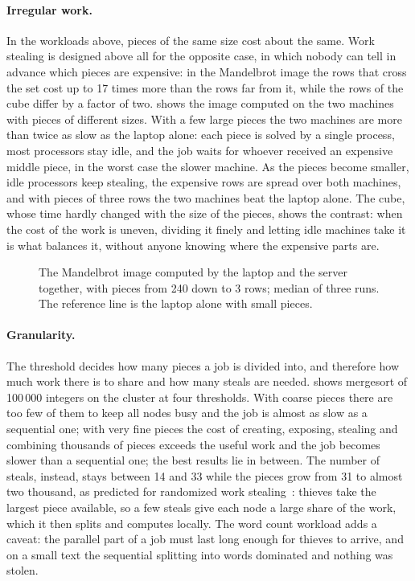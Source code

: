 \documentclass{scrartcl}
\begin{document}
\paragraph{Irregular work.}
In the workloads above, pieces of the same size cost about the same.
%
Work stealing is designed above all for the opposite case, in which nobody can tell in advance which pieces are expensive: in the Mandelbrot image the rows that cross the set cost up to 17 times more than the rows far from it, while the rows of the cube differ by a factor of two.
%
 shows the image computed on the two machines with pieces of different sizes.
%
With a few large pieces the two machines are more than twice as slow as the laptop alone: each piece is solved by a single process, most processors stay idle, and the job waits for whoever received an expensive middle piece, in the worst case the slower machine.
%
As the pieces become smaller, idle processors keep stealing, the expensive rows are spread over both machines, and with pieces of three rows the two machines beat the laptop alone.
%
The cube, whose time hardly changed with the size of the pieces, shows the contrast: when the cost of the work is uneven, dividing it finely and letting idle machines take it is what balances it, without anyone knowing where the expensive parts are.

\begin{figure}
  \centering
  
  \caption{The Mandelbrot image computed by the laptop and the server together, with pieces from 240 down to 3 rows; median of three runs. The reference line is the laptop alone with small pieces.}
  \label{fig:mandelbrot-pieces}
\end{figure}

\paragraph{Granularity.}
The threshold decides how many pieces a job is divided into, and therefore how much work there is to share and how many steals are needed.
%
 shows mergesort of 100\,000 integers on the cluster at four thresholds.
%
With coarse pieces there are too few of them to keep all nodes busy and the job is almost as slow as a sequential one; with very fine pieces the cost of creating, exposing, stealing and combining thousands of pieces exceeds the useful work and the job becomes slower than a sequential one; the best results lie in between.
%
The number of steals, instead, stays between 14 and 33 while the pieces grow from 31 to almost two thousand, as predicted for randomized work stealing~\cite{blumofe1999scheduling}: thieves take the largest piece available, so a few steals give each node a large share of the work, which it then splits and computes locally.
%
The word count workload adds a caveat: the parallel part of a job must last long enough for thieves to arrive, and on a small text the sequential splitting into words dominated and nothing was stolen.
\end{document}

